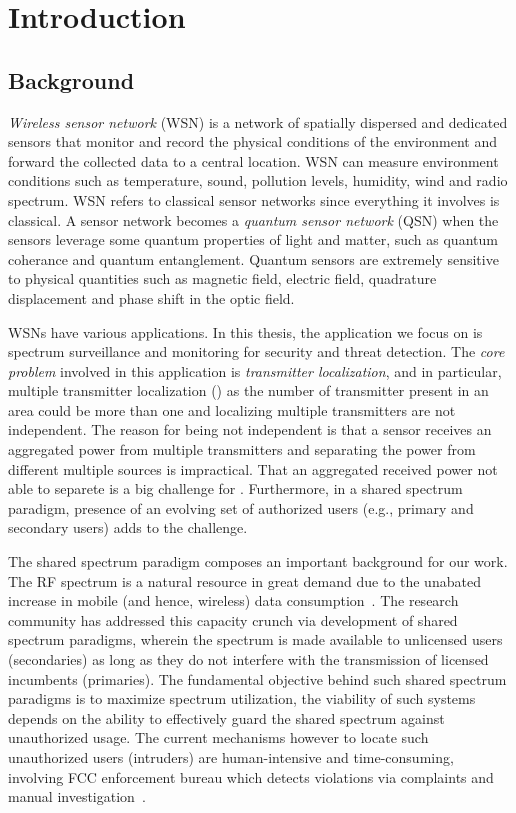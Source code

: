 \chapter{Introduction}
\label{chap:intro}

\section{Background}

\emph{Wireless sensor network} (WSN) is a network of spatially dispersed and dedicated sensors that monitor and record the 
physical conditions of the environment and forward the collected data to a central location.
WSN can measure environment conditions such as temperature, sound, pollution levels, humidity, wind and radio spectrum.
WSN refers to classical sensor networks since everything it involves is classical.
A sensor network becomes a \emph{quantum sensor network} (QSN) when the sensors leverage some quantum properties of light and matter, 
such as quantum coherance and quantum entanglement.
Quantum sensors are extremely sensitive to physical quantities such as magnetic field, electric field, quadrature displacement
and phase shift in the optic field.

 WSNs have various applications.
In this thesis, the application we focus on is spectrum surveillance and monitoring for security and threat detection.
The \emph{core problem} involved in this application is \emph{transmitter localization}, and in particular, multiple transmitter localization (\mtl) as 
the number of transmitter present in an area could be more than one and localizing multiple transmitters are not independent.
The reason for being not independent is that a sensor receives an aggregated power from multiple transmitters and separating 
the power from different multiple sources is impractical.
That an aggregated received power not able to separete is a big challenge for \mtl.
Furthermore, in a shared spectrum paradigm, presence of an evolving set of authorized users 
(e.g., primary and secondary users) adds to the challenge.

The shared spectrum paradigm composes an important background for our \mtl work.
The RF spectrum is a natural resource in great demand due to the unabated increase in mobile (and hence, wireless) data consumption~\cite{Jeffrey14}. 
The research community has addressed this capacity crunch via development of shared spectrum paradigms, wherein the spectrum 
is made available to unlicensed users (secondaries) as long as they do not interfere with the transmission of licensed incumbents (primaries).
The fundamental objective behind such shared spectrum paradigms is to maximize spectrum utilization,
the viability of such systems depends on the ability to effectively guard the shared spectrum against unauthorized usage. 
The current mechanisms however to locate such unauthorized users (intruders) are human-intensive and time-consuming, 
involving FCC enforcement bureau which detects violations via complaints and manual investigation~\cite{mobicom17-splot}. 

